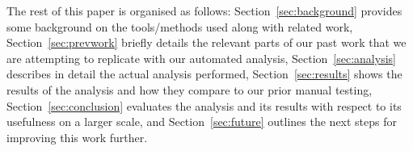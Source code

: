 The rest of this paper is organised as follows: Section~\ref{sec:background} provides some background on the tools/methods used along with related work, Section~\ref{sec:prevwork} briefly details the relevant parts of our past work that we are attempting to replicate with our automated analysis, Section~\ref{sec:analysis} describes in detail the actual analysis performed, Section~\ref{sec:results} shows the results of the analysis and how they compare to our prior manual testing, Section~\ref{sec:conclusion} evaluates the analysis and its results with respect to its usefulness on a larger scale, and Section~\ref{sec:future} outlines the next steps for improving this work further.
